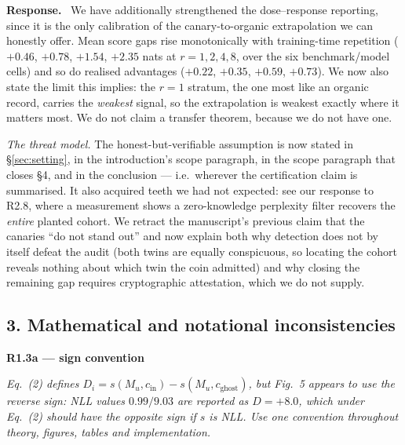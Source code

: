 \documentclass[11pt,a4paper]{article}
\newenvironment{point}[1]{%
  \par\medskip\noindent\textbf{\color{rcol}#1}\par\nopagebreak\smallskip\begingroup
  \color{rcol}\itshape}{\endgroup\par}
\newenvironment{reply}{%
  \par\smallskip\noindent\textbf{\color{acol}Response.}\ \begingroup}{\endgroup\par}
\begin{document}
\begin{reply}
We have additionally strengthened the dose--response reporting, since it is the only
calibration of the canary-to-organic extrapolation we can honestly offer. Mean score
gaps rise monotonically with training-time repetition ($+0.46$, $+0.78$, $+1.54$,
$+2.35$ nats at $r = 1,2,4,8$, over the six benchmark/model cells) and so do realised
advantages ($+0.22$, $+0.35$, $+0.59$, $+0.73$). We now also state the limit this implies: the $r=1$ stratum, the one
most like an organic record, carries the \emph{weakest} signal, so the extrapolation is
weakest exactly where it matters most. We do not claim a transfer theorem, because we
do not have one.

\emph{The threat model.} The honest-but-verifiable assumption is now stated in \S\ref{sec:setting},
in the introduction's scope paragraph, in the scope paragraph that closes \S4, and in the conclusion --- i.e.\ wherever
the certification claim is summarised. It also acquired teeth we had not expected: see
our response to R2.8, where a measurement shows a zero-knowledge perplexity filter
recovers the \emph{entire} planted cohort. We retract the manuscript's previous claim
that the canaries ``do not stand out'' and now explain both why detection does not by
itself defeat the audit (both twins are equally conspicuous, so locating the cohort
reveals nothing about which twin the coin admitted) and why closing the remaining gap
requires cryptographic attestation, which we do not supply.
\end{reply}

\subsection*{3. Mathematical and notational inconsistencies}

\begin{point}{R1.3a --- sign convention}
Eq.~(2) defines $D_i = s(M_u, c_{\mathrm{in}}) - s(M_u, c_{\mathrm{ghost}})$, but
Fig.~5 appears to use the reverse sign: NLL values $0.99/9.03$ are reported as
$D = +8.0$, which under Eq.~(2) should have the opposite sign if $s$ is NLL. Use one
convention throughout theory, figures, tables and implementation.
\end{point}
\end{document}
